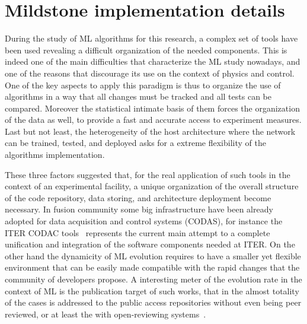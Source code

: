 \chapter{Mildstone implementation details}
\label{section:5_mildstone}

During the study of ML algorithms for this research, a complex set of tools have been used revealing a difficult organization of the needed components.
This is indeed one of the main difficulties that characterize the ML study nowadays, and one of the reasons that discourage its use on the context of physics and control.
One of the key aspects to apply this paradigm is thus to organize the use of algorithms in a way that all changes must be tracked and all tests can be compared.
Moreover the statistical intimate basis of them forces the organization of the data as well, to provide a fast and accurate access to experiment measures. 
Last but not least, the heterogeneity of the host architecture where the network can be trained, tested, and deployed asks for a extreme flexibility of the algorithms implementation.

These three factors suggested that, for the real application of such tools in the context of an experimental facility, a unique organization of the overall structure of the code repository, data storing, and architecture deployment become necessary.
In fusion community some big infrastructure have been already adopted for data acquisition and control systems (CODAS), for instance the ITER CODAC tools~\cite{iter_CODAC} represents the current main attempt to a complete unification and integration of the software components needed at ITER.
On the other hand the dynamicity of ML evolution requires to have a smaller yet flexible environment that can be easily made compatible with the rapid changes that the community of developers propose.
A interesting meter of the evolution rate in the context of ML is the publication target of such works, that in the almost totality of the cases is addressed to the public access repositories without even being peer reviewed, or at least the with open-reviewing systems~\cite{open_review}. 

